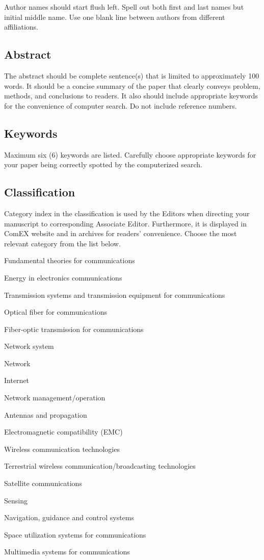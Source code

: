 \documentclass{comex}
\begin{document}
Author names should start flush left. Spell out both first and last
names but initial middle name. Use one blank line between authors from
different affiliations.

\subsection{Abstract}

The abstract should be complete sentence(s) that is limited to
approximately 100 words. It should be a concise summary of the paper
that clearly conveys
problem,
methods, and
conclusions to readers. It also should include appropriate keywords for
the convenience of computer search. Do not include reference numbers.

\subsection{Keywords}

Maximum six (6) keywords are listed. Carefully choose appropriate
keywords for your paper being correctly spotted by the computerized search.

\subsection{Classification}
\label{sec:class}
Category index in the classification is used by the Editors 
when directing your manuscript to corresponding Associate
Editor. Furthermore, it is displayed in ComEX website and in archives for
readers' convenience. Choose the most relevant category from
the list below.

\begin{itemize}
\begin{small}
\item Fundamental theories for communications 
\item Energy in electronics communications 
\item Transmission systems and transmission equipment for communications
\item Optical fiber for communications
\item Fiber-optic transmission for communications
\item Network system
\item Network
\item Internet
\item Network management/operation
\item Antennas and propagation
\item Electromagnetic compatibility (EMC)
\item Wireless communication technologies
\item Terrestrial wireless communication/broadcasting technologies
\item Satellite communications
\item Sensing
\item Navigation, guidance and control systems
\item Space utilization systems for communications
\item Multimedia systems for communications
\end{small}
\end{itemize}
\end{document}
